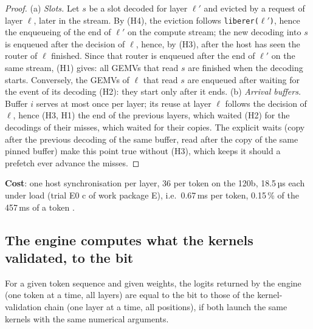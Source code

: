 \begin{proof}
(a) \emph{Slots.} Let $s$ be a slot decoded for layer $\ell'$ and evicted by a request of layer $\ell$, later in the stream. By (H4), the eviction follows \texttt{liberer($\ell'$)}, hence the enqueueing of the end of $\ell'$ on the compute stream; the new decoding into $s$ is enqueued after the decision of $\ell$, hence, by (H3), after the host has seen the router of $\ell$ finished. Since that router is enqueued after the end of $\ell'$ on the same stream, (H1) gives: all GEMVs that read $s$ are finished when the decoding starts. Conversely, the GEMVs of $\ell$ that read $s$ are enqueued after waiting for the event of its decoding (H2): they start only after it ends.
(b) \emph{Arrival buffers.} Buffer $i$ serves at most once per layer; its reuse at layer $\ell$ follows the decision of $\ell$, hence (H3, H1) the end of the previous layers, which waited (H2) for the decodings of their misses, which waited for their copies. The explicit waits (copy after the previous decoding of the same buffer, read after the copy of the same pinned buffer) make this point true without (H3), which keeps it should a prefetch ever advance the misses.
\end{proof}

\textbf{Cost}: one host synchronisation per layer, 36 per token on the 120b, 18.5\,µs each under load (trial E0 c of work package E), i.e.\ 0.67\,ms per token, 0.15\,\% of the 457\,ms of a token \calc.

\subsection{The engine computes what the kernels validated, to the bit}

\begin{proposition}\label{prop:t2o-ordre-calcul}
For a given token sequence and given weights, the logits returned by the engine (one token at a time, all layers) are equal to the bit to those of the kernel-validation chain (one layer at a time, all positions), if both launch the same kernels with the same numerical arguments.
\end{proposition}

